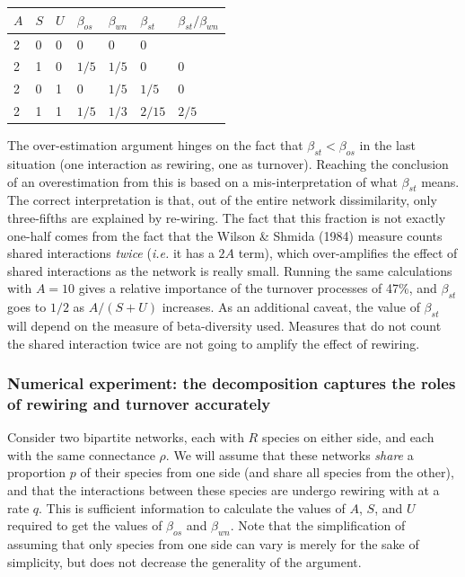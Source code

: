 \documentclass[10pt,oneside]{article}
\begin{document}
\begin{longtable}[]{@{}lllllll@{}}
\toprule
\(A\) & \(S\) & \(U\) & \(\beta_{os}\) & \(\beta_{wn}\) & \(\beta_{st}\)
& \(\beta_{st}/\beta_{wn}\)\tabularnewline
\midrule
\endhead
2 & 0 & 0 & 0 & 0 & 0 &\tabularnewline
2 & 1 & 0 & \(1/5\) & \(1/5\) & 0 & 0\tabularnewline
2 & 0 & 1 & 0 & \(1/5\) & \(1/5\) & 0\tabularnewline
2 & 1 & 1 & \(1/5\) & \(1/3\) & \(2/15\) & \(2/5\)\tabularnewline
\bottomrule
\end{longtable}

The over-estimation argument hinges on the fact that
\(\beta_{st} < \beta_{os}\) in the last situation (one interaction as
rewiring, one as turnover). Reaching the conclusion of an overestimation
from this is based on a mis-interpretation of what \(\beta_{st}\) means.
The correct interpretation is that, out of the entire network
dissimilarity, only three-fifths are explained by re-wiring. The fact
that this fraction is not exactly one-half comes from the fact that the
Wilson \& Shmida (1984) measure counts shared interactions \emph{twice}
(\emph{i.e.} it has a \(2A\) term), which over-amplifies the effect of
shared interactions as the network is really small. Running the same
calculations with \(A = 10\) gives a relative importance of the turnover
processes of 47\%, and \(\beta_{st}\) goes to \(1/2\) as \(A/(S+U)\)
increases. As an additional caveat, the value of \(\beta_{st}\) will
depend on the measure of beta-diversity used. Measures that do not count
the shared interaction twice are not going to amplify the effect of
rewiring.

\hypertarget{numerical-experiment-the-decomposition-captures-the-roles-of-rewiring-and-turnover-accurately}{%
\subsubsection{Numerical experiment: the decomposition captures the
roles of rewiring and turnover
accurately}\label{numerical-experiment-the-decomposition-captures-the-roles-of-rewiring-and-turnover-accurately}}

Consider two bipartite networks, each with \(R\) species on either side,
and each with the same connectance \(\rho\). We will assume that these
networks \emph{share} a proportion \(p\) of their species from one side
(and share all species from the other), and that the interactions
between these species are undergo rewiring with at a rate \(q\). This is
sufficient information to calculate the values of \(A\), \(S\), and
\(U\) required to get the values of \(\beta_{os}\) and \(\beta_{wn}\).
Note that the simplification of assuming that only species from one side
can vary is merely for the sake of simplicity, but does not decrease the
generality of the argument.
\end{document}
